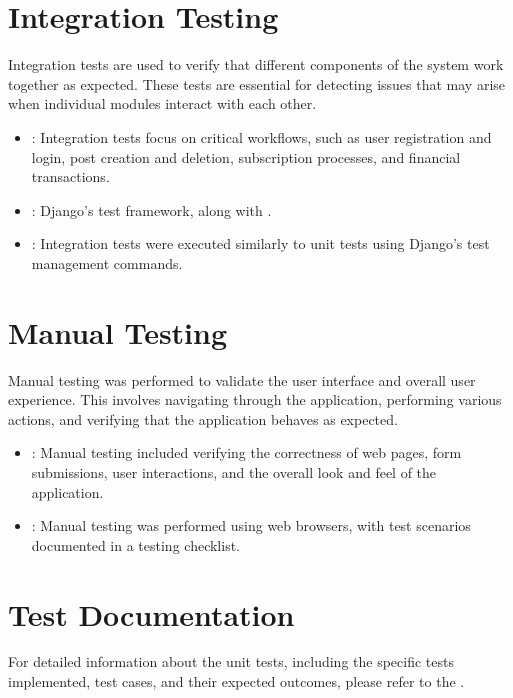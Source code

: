 \documentclass[letterpaper,10pt,english]{sphinxmanual}
\begin{document}
\section{Integration Testing}
\label{\detokenize{modules/testing:integration-testing}}
\sphinxAtStartPar
Integration tests are used to verify that different components of the system work together as expected. These tests are essential for detecting issues that may arise when individual modules interact with each other.
\begin{itemize}
\item {} 
\sphinxAtStartPar
{}: Integration tests focus on critical workflows, such as user registration and login, post creation and deletion, subscription processes, and financial transactions.

\item {} 
\sphinxAtStartPar
{}: Django’s test framework, along with .

\item {} 
\sphinxAtStartPar
{}: Integration tests were executed similarly to unit tests using Django’s test management commands.

\end{itemize}


\section{Manual Testing}
\label{\detokenize{modules/testing:manual-testing}}
\sphinxAtStartPar
Manual testing was performed to validate the user interface and overall user experience. This involves navigating through the application, performing various actions, and verifying that the application behaves as expected.
\begin{itemize}
\item {} 
\sphinxAtStartPar
{}: Manual testing included verifying the correctness of web pages, form submissions, user interactions, and the overall look and feel of the application.

\item {} 
\sphinxAtStartPar
{}: Manual testing was performed using web browsers, with test scenarios documented in a testing checklist.

\end{itemize}


\section{Test Documentation}
\label{\detokenize{modules/testing:test-documentation}}
\sphinxAtStartPar
For detailed information about the unit tests, including the specific tests implemented, test cases, and their expected outcomes, please refer to the .
\end{document}
